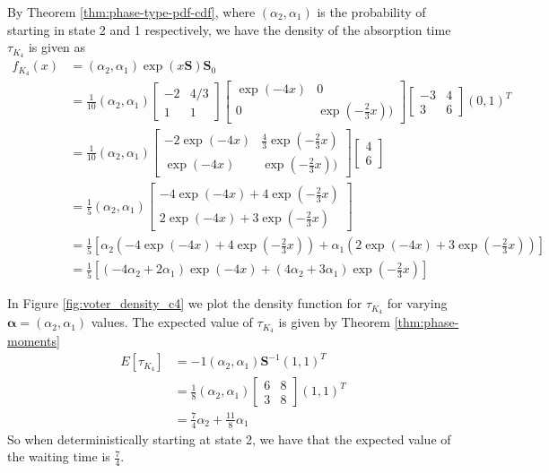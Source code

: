 By Theorem \ref{thm:phase-type-pdf-cdf}, where $(\alpha_2, \alpha_1)$ is the probability of starting in state 2 and 1 respectively, we have the density of the absorption time $\tau_{K_4}$ is given as
\begin{align*}
    f_{K_4}(x) &= (\alpha_2, \alpha_1) \exp(x\mathbf{S}) \mathbf{S}_0\\
    &= \frac{1}{10} (\alpha_2, \alpha_1) \begin{bmatrix}
    -2 & 4/3\\
    1 & 1
\end{bmatrix}
\begin{bmatrix}
\exp(-4x) & 0\\
0 & \exp(- \frac{2}{3} x))
\end{bmatrix}
\begin{bmatrix}
    -3 & 4\\
    3 & 6
\end{bmatrix}
(0,1)^T\\
&= \frac{1}{10} (\alpha_2, \alpha_1)
\begin{bmatrix}
-2 \exp(-4x) & \frac{4}{3} \exp(-\frac{2}{3} x)\\
\exp(-4x) & \exp(- \frac{2}{3} x))
\end{bmatrix}
\begin{bmatrix}
    4\\
    6
\end{bmatrix}\\
&= \frac{1}{5} (\alpha_2, \alpha_1)
\begin{bmatrix}
-4 \exp(-4x) + 4 \exp(-\frac{2}{3} x)\\
2 \exp(-4x) + 3 \exp(-\frac{2}{3} x)
\end{bmatrix}\\
&= \frac{1}{5} \left[ \alpha_2 \left( -4 \exp(-4x) + 4 \exp\left(-\frac{2}{3} x\right) \right) + \alpha_1 \left( 2 \exp(-4x) + 3 \exp\left(-\frac{2}{3} x\right) \right) \right]\\
&= \frac{1}{5} \left[ (-4 \alpha_2 + 2 \alpha_1) \exp(-4x) + (4 \alpha_2 + 3 \alpha_1) \exp\left(-\frac{2}{3} x\right)\right]
\end{align*}

In Figure \ref{fig:voter_density_c4} we plot the density function for $\tau_{K_4}$ for varying $\boldsymbol{\alpha} = (\alpha_2, \alpha_1)$ values.
The expected value of $\tau_{K_4}$ is given by Theorem \ref{thm:phase-moments}
\begin{align*}
    E[\tau_{K_4}] &= -1 (\alpha_2, \alpha_1) \mathbf{S}^{-1} (1, 1)^T\\
    &= \frac{1}{8} (\alpha_2, \alpha_1) \begin{bmatrix}
    6 & 8\\
    3 & 8
    \end{bmatrix} (1,1)^T\\
    &= \frac{7}{4} \alpha_2 + \frac{11}{8} \alpha_1
\end{align*}
So when deterministically starting at state 2, we have that the expected value of the waiting time is $\frac{7}{4}$.

